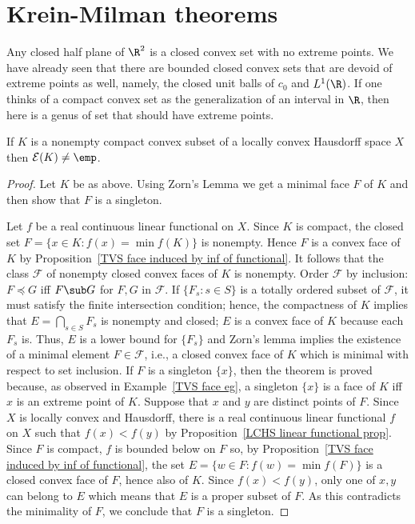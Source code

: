 \section{Krein-Milman theorems}
Any closed half plane of $\R^2$ is a closed convex set with no extreme points. We have already seen that there are bounded closed convex sets that are devoid of extreme points as well, namely, the closed unit balls of $c_0$ and $L^1(\R)$. If one thinks of a compact convex set as the generalization of an interval in $\R$, then here is a genus of set that should have extreme points.
\begin{theorem}\label{Krein-Milman compact convex has extreme point}
If $K$ is a nonempty compact convex subset of a locally convex Hausdorff space $X$ then $\mathcal{E}(K)\neq\emp$.
\end{theorem}
\begin{proof}
Let $K$ be as above. Using Zorn's Lemma we get a minimal face $F$ of $K$ and then show that $F$ is a singleton.\par
Let $f$ be a real continuous linear functional on $X$. Since $K$ is compact, the closed set $F=\{x\in K:f(x)=\min f(K)\}$ is nonempty. Hence $F$ is a convex face of $K$ by Proposition~\ref{TVS face induced by inf of functional}. It follows that the class $\mathcal{F}$ of nonempty closed convex faces of $K$ is nonempty. Order $\mathcal{F}$ by inclusion: $F\preceq G$ iff $F\sub G$ for $F,G$ in $\mathcal{F}$. If $\{F_s:s\in S\}$ is a totally ordered subset of $\mathcal{F}$, it must satisfy the finite intersection condition; hence, the compactness of $K$ implies that $E=\bigcap_{s\in S}F_s$ is nonempty and closed; $E$ is a convex face of $K$ because each $F_s$ is. Thus, $E$ is a lower bound for $\{F_s\}$ and Zorn's lemma implies the existence of a minimal element $F\in\mathcal{F}$, i.e., a closed convex face of $K$ which is minimal with respect to set inclusion. If $F$ is a singleton $\{x\}$, then the theorem is proved because, as observed in Example~\ref{TVS face eg}, a singleton $\{x\}$ is a face of $K$ iff $x$ is an extreme point of $K$. Suppose that $x$ and $y$ are distinct points of $F$. Since $X$ is locally convex and Hausdorff, there is a real continuous linear functional $f$ on $X$ such that $f(x)<f(y)$ by Proposition~\ref{LCHS linear functional prop}. Since $F$ is compact, $f$ is bounded below on $F$ so, by Proposition~\ref{TVS face induced by inf of functional}, the set $E=\{w\in F:f(w)=\min f(F)\}$ is a closed convex face of $F$, hence also of $K$. Since $f(x)<f(y)$, only one of $x,y$ can belong to $E$ which means that $E$ is a proper subset of $F$. As this contradicts the minimality of $F$, we conclude that $F$ is a singleton.
\end{proof}
